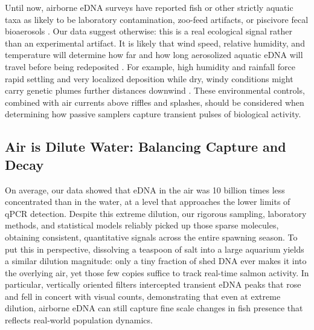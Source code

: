 \documentclass{article}
\begin{document}
Until now, airborne eDNA surveys have reported fish or other strictly aquatic taxa as likely to be laboratory contamination, zoo-feed artifacts, or piscivore fecal bioaerosols \cite{klepke2022,lynggaard2023, sullivan2023,lynggaard2022}. Our data suggest otherwise: this is a real ecological signal rather than an experimental artifact. It is likely that wind speed, relative humidity, and temperature will determine how far and how long aerosolized aquatic eDNA will travel before being redeposited \cite{abrego2024,giolai2024}. For example, high humidity and rainfall force rapid settling and very localized deposition while dry, windy conditions might carry genetic plumes further distances downwind \cite{galban2021,maki2023}. These environmental controls, combined with air currents above riffles and splashes, should be considered when determining how passive samplers capture transient pulses of biological activity.

\subsection{Air is Dilute Water: Balancing Capture and Decay}
On average, our data showed that eDNA in the air was 10 billion times less concentrated than in the water, at a level that approaches the lower limits of qPCR detection. Despite this extreme dilution, our rigorous sampling, laboratory methods, and statistical models reliably picked up those sparse molecules, obtaining consistent, quantitative signals across the entire spawning season. To put this in perspective, dissolving a teaspoon of salt into a large aquarium yields a similar dilution magnitude: only a tiny fraction of shed DNA ever makes it into the overlying air, yet those few copies suffice to track real-time salmon activity. In particular, vertically oriented filters intercepted transient eDNA peaks that rose and fell in concert with visual counts, demonstrating that even at extreme dilution, airborne eDNA can still capture fine scale changes in fish presence that reflects real-world population dynamics.
\end{document}

